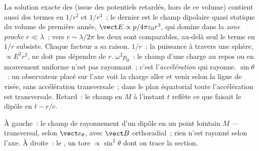 \begin{remark}\label{rem:b2:dipole-radiation:reading}
La solution exacte des  (issue des potentiels
retardés, hors de ce volume) contient aussi des termes en $1/r^2$ et
$1/r^3$~; le dernier est le champ dipolaire quasi statique du volume de
première année, $\vect E \propto p/4\pi\varepsilon_0r^3$, qui domine dans la \emph{zone
proche} $r \ll \lambda$~; vers $r \sim \lambda/2\pi$ les deux sont comparables, au-delà
seul le terme en $1/r$ subsiste. Chaque facteur a sa raison. $1/r$~: la
puissance à travers une sphère, $\propto E^2r^2$, ne doit pas dépendre de $r$. $\omega^2p_0$~:
le champ d'une charge au repos ou en mouvement uniforme n'est pas rayonnant~; c'est
l'\emph{accélération} qui rayonne. $\sin\theta$~: un observateur placé sur
l'axe voit la charge aller et venir selon la ligne de visée, sans
accélération transversale~; dans le plan équatorial toute
l'accélération est transversale. Retard~: le champ en $M$ à l'instant $t$
reflète ce que faisait le dipôle en $t - r/c$.
\end{remark}

\begin{omfigure}

{\small À gauche~: le champ de rayonnement d'un dipôle en un point lointain $M$ ---
transversal, selon $\vect e_\theta$, avec $\vect B$ orthoradial~; rien n'est
rayonné selon l'axe. À droite~: le , un tore
$\propto\sin^2\theta$ dont on trace la section.}
\end{omfigure}

